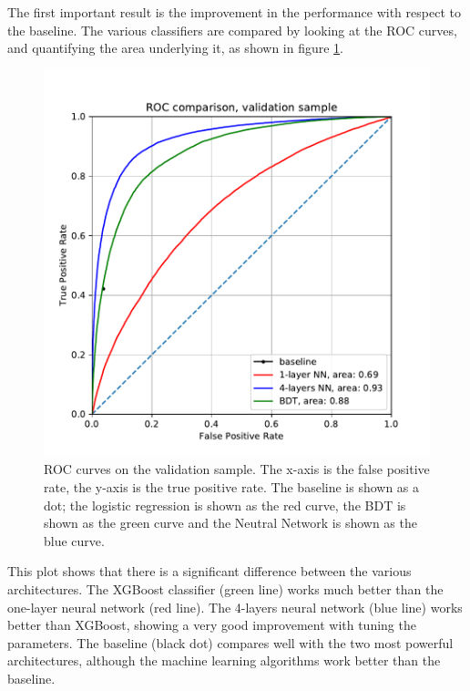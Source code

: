 \documentclass{article}
\begin{document}
The first important result is the improvement in the performance with respect to the baseline. The various classifiers are compared by looking at the ROC curves, and quantifying the area underlying it, as shown in figure \ref{fig:roc}.

\begin{figure}[!h]
  \centering
  \includegraphics[width=\columnwidth]{roc_curves.pdf}
  \caption{ROC curves on the validation sample. The x-axis is the false positive rate, the y-axis is the true positive rate. The baseline is shown as a dot; the logistic regression is shown as the red curve, the BDT is shown as the green curve and the Neutral Network is shown as the blue curve.}
  \label{fig:roc}
\end{figure}

This plot shows that there is a significant difference between the various architectures. The XGBoost classifier (green line) works much better than the one-layer neural network (red line). The 4-layers neural network (blue line) works better than XGBoost, showing a very good improvement with tuning the parameters. The baseline (black dot) compares well with the two most powerful architectures, although the machine learning algorithms work better than the baseline.
\end{document}
